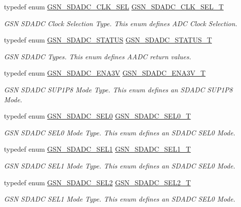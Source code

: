 \begin{DoxyCompactItemize}
typedef enum \hyperlink{a00652_gac143749cf1a15e188558bc6ac9d32de2}{GSN\_\-SDADC\_\-CLK\_\-SEL} \hyperlink{a00652_ga3e84e460cc728aac5ff89621cc0ede91}{GSN\_\-SDADC\_\-CLK\_\-SEL\_\-T}
\begin{DoxyCompactList}\small\item\em GSN SDADC Clock Selection Type. This enum defines ADC Clock Selection. \end{DoxyCompactList}\item 
typedef enum \hyperlink{a00652_ga179a090b2c7d55f208c9a4a6c79eda05}{GSN\_\-SDADC\_\-STATUS} \hyperlink{a00652_ga36cbafd55d35763f491d3ba72f61ca51}{GSN\_\-SDADC\_\-STATUS\_\-T}
\begin{DoxyCompactList}\small\item\em GSN SDADC Types. This enum defines AADC return values. \end{DoxyCompactList}\item 
typedef enum \hyperlink{a00652_ga30a4571db8d9a123a6c9cf0f5c3c1146}{GSN\_\-SDADC\_\-ENA3V} \hyperlink{a00652_ga7c75febfa676ff7198e6665692e07c61}{GSN\_\-SDADC\_\-ENA3V\_\-T}
\begin{DoxyCompactList}\small\item\em GSN SDADC SUP1P8 Mode Type. This enum defines an SDADC SUP1P8 Mode. \end{DoxyCompactList}\item 
typedef enum \hyperlink{a00652_ga033785abce307d457533dfa53b59d84b}{GSN\_\-SDADC\_\-SEL0} \hyperlink{a00652_ga1211f3eac3c8c6697324a356da4dbcb7}{GSN\_\-SDADC\_\-SEL0\_\-T}
\begin{DoxyCompactList}\small\item\em GSN SDADC SEL0 Mode Type. This enum defines an SDADC SEL0 Mode. \end{DoxyCompactList}\item 
typedef enum \hyperlink{a00652_ga7881f6f750388de2816384904fafac2a}{GSN\_\-SDADC\_\-SEL1} \hyperlink{a00652_ga851e1269993bbdc128b392fd7216ade7}{GSN\_\-SDADC\_\-SEL1\_\-T}
\begin{DoxyCompactList}\small\item\em GSN SDADC SEL1 Mode Type. This enum defines an SDADC SEL0 Mode. \end{DoxyCompactList}\item 
typedef enum \hyperlink{a00652_gad596a4cc54081bcce130d18d07fd701a}{GSN\_\-SDADC\_\-SEL2} \hyperlink{a00652_ga21776f699fb060e738c464107e435df4}{GSN\_\-SDADC\_\-SEL2\_\-T}
\begin{DoxyCompactList}\small\item\em GSN SDADC SEL1 Mode Type. This enum defines an SDADC SEL0 Mode. \end{DoxyCompactList}\item 

\end{DoxyCompactItemize}
